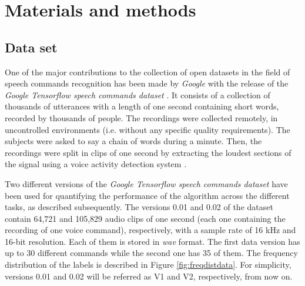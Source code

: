 
 \section{Materials and methods} \label{sec:MM}

\subsection{Data set}
One of the major contributions to the collection of open datasets in the field of speech commands recognition has been made by \textit{Google} with the release of the \textit{Google Tensorflow speech commands dataset} \autocite{speechcommands, Warden2018}. It consists of a collection of thousands of utterances with a length of one second containing short words, recorded by thousands of people. The recordings were collected remotely, in uncontrolled environments (i.e. without any specific quality requirements). The subjects were asked to say a chain of words during a minute. Then, the recordings were split in clips of one second by extracting the loudest sections of the signal using a voice activity detection system \autocite{speechcommands, Warden2018}.

Two different versions of the \textit{Google Tensorflow speech commands dataset} have been used for quantifying the performance of the algorithm across the different tasks, as described subsequently. The versions 0.01 and 0.02 of the dataset contain 64,721 and 105,829 audio clips of one second (each one containing the recording of one voice command), respectively, with a sample rate of 16 kHz and 16-bit resolution. Each of them is stored in \textit{wav} format. The first data version has up to 30 different commands while the second one has 35 of them. The frequency distribution of the labels is described in Figure \ref{fig:freqdistdata}. For simplicity, versions 0.01 and 0.02 will be referred as V1 and V2, respectively, from now on.


